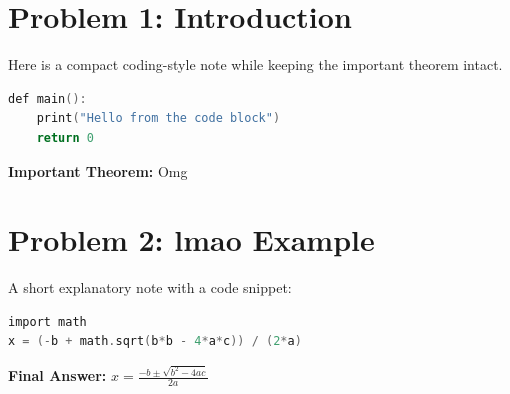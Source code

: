 \documentclass[11pt, a4paper]{article}
\begin{document}
\section*{Problem 1: Introduction}
Here is a compact coding-style note while keeping the important theorem intact.

\begin{lstlisting}[language=C]
def main():
    print("Hello from the code block")
    return 0
\end{lstlisting}

\begin{box1}
  \textbf{Important Theorem:} Omg
\end{box1}

\section*{Problem 2: lmao Example}
A short explanatory note with a code snippet:

\begin{lstlisting}[language=C]
import math
x = (-b + math.sqrt(b*b - 4*a*c)) / (2*a)
\end{lstlisting}

\lipsum[1] %

\begin{box2}
  \textbf{Final Answer:} $x = \frac{-b \pm \sqrt{b^2 - 4ac}}{2a}$
\end{box2}
\end{document}
